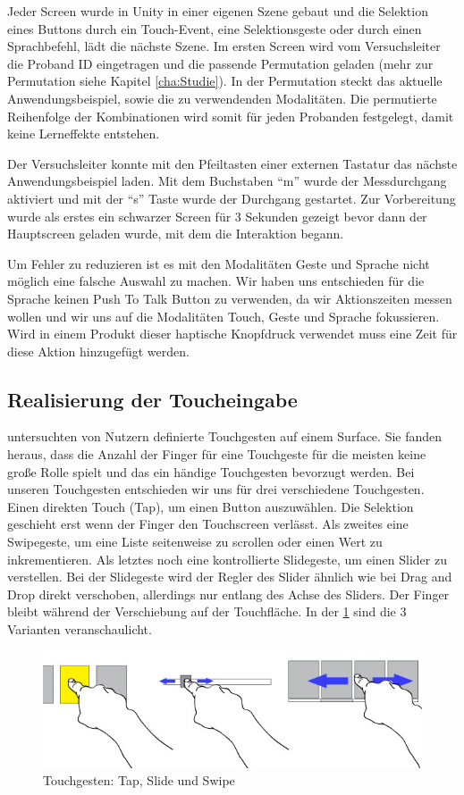 Jeder Screen wurde in Unity in einer eigenen Szene gebaut und die Selektion eines Buttons durch ein Touch-Event, eine Selektionsgeste oder durch einen Sprachbefehl, lädt die nächste Szene. 
Im ersten Screen wird vom Versuchsleiter die Proband ID eingetragen und die passende Permutation geladen (mehr zur Permutation siehe Kapitel \ref{cha:Studie}). 
In der Permutation steckt das aktuelle Anwendungsbeispiel, sowie die zu verwendenden Modalitäten. 
Die permutierte Reihenfolge der Kombinationen wird somit für jeden Probanden festgelegt, damit keine Lerneffekte entstehen. 

Der Versuchsleiter konnte mit den Pfeiltasten einer externen Tastatur das nächste Anwendungsbeispiel laden. 
Mit dem Buchstaben "`m"' wurde der Messdurchgang aktiviert und mit der "`s"' Taste wurde der Durchgang gestartet.  
Zur Vorbereitung wurde als erstes ein schwarzer Screen für 3 Sekunden gezeigt bevor dann der Hauptscreen geladen wurde, mit dem die Interaktion begann.

Um Fehler zu reduzieren ist es mit den Modalitäten Geste und Sprache nicht möglich eine falsche Auswahl zu machen. 
Wir haben uns entschieden für die Sprache keinen Push To Talk Button zu verwenden, da wir Aktionszeiten messen wollen und wir uns auf die Modalitäten Touch, Geste und Sprache fokussieren. 
Wird in einem Produkt dieser haptische Knopfdruck verwendet muss eine Zeit für diese Aktion hinzugefügt werden.  
\subsection[Touch]{Realisierung der Toucheingabe} 
\citet{Wobbrock:2009} untersuchten von Nutzern definierte Touchgesten auf einem Surface. 
Sie fanden heraus, dass die Anzahl der Finger für eine Touchgeste für die meisten keine große Rolle spielt und das ein händige Touchgesten bevorzugt werden. 
Bei unseren Touchgesten entschieden wir uns für drei verschiedene Touchgesten. 
Einen direkten Touch (Tap), um einen Button auszuwählen. 
Die Selektion geschieht erst wenn der Finger den Touchscreen verlässt. 
Als zweites eine Swipegeste, um eine Liste seitenweise zu scrollen oder einen Wert zu inkrementieren. 
Als letztes noch eine kontrollierte Slidegeste, um einen Slider zu verstellen. 
Bei der Slidegeste wird der Regler des Slider ähnlich wie bei Drag and Drop direkt verschoben, allerdings nur entlang des Achse des Sliders. 
Der Finger bleibt während der Verschiebung auf der Touchfläche. 
In der \ref{fig:TouchGestures} sind die 3 Varianten veranschaulicht.
\begin{figure}
	\centering
		\includegraphics[width=1\textwidth]{img/TouchGestures.jpg}
	\caption{Touchgesten: Tap, Slide und Swipe}
	\label{fig:TouchGestures}
\end{figure}
